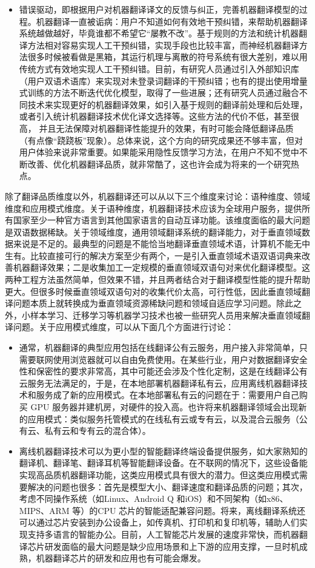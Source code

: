 \begin{spacing}{1.18}
\begin{itemize}
\item 错误驱动，即根据用户对机器翻译译文的反馈与纠正，完善机器翻译模型的过程。机器翻译一直被诟病：用户不知道如何有效地干预纠错，来帮助机器翻译系统越做越好，毕竟谁都不希望它“屡教不改”。基于规则的方法和统计机器翻译方法相对容易实现人工干预纠错，实现手段也比较丰富，而神经机器翻译方法很多时候被看做是黑箱，其运行机理与离散的符号系统有很大差别，难以用传统方式有效地实现人工干预纠错。目前，有研究人员通过引入外部知识库（用户双语术语库）来实现对未登录词翻译的干预纠错；也有的提出使用增量式训练的方法不断迭代优化模型，取得了一些进展；还有研究人员通过融合不同技术来实现更好的机器翻译效果，如引入基于规则的翻译前处理和后处理，或者引入统计机器翻译技术优化译文选择等。这些方法的代价不低，甚至很高， 并且无法保障对机器翻译性能提升的效果，有时可能会降低翻译品质（有点像“跷跷板”现象）。总体来说，这个方向的研究成果还不够丰富，但对用户体验来说非常重要。如果能采用隐性反馈学习方法，在用户不知不觉中不断改善、优化机器翻译品质，就非常酷了，这也许会成为将来的一个研究热点。
\end{itemize}

\parinterval 除了翻译品质维度以外，机器翻译还可以从以下三个维度来讨论：语种维度、领域维度和应用模式维度。关于语种维度，机器翻译技术应该为全球用户服务，提供所有国家至少一种官方语言到其他国家语言的自动互译功能。该维度面临的最大问题是双语数据稀缺。关于领域维度，通用领域翻译系统的翻译能力，对于垂直领域数据来说是不足的。最典型的问题是不能恰当地翻译垂直领域术语，计算机不能无中生有。比较直接可行的解决方案至少有两个，一是引入垂直领域术语双语词典来改善机器翻译效果；二是收集加工一定规模的垂直领域双语句对来优化翻译模型。这两种工程方法虽然简单，但效果不错，并且两者结合对于翻译模型性能的提升帮助更大。但很多时候垂直领域双语句对的收集代价太高，可行性低，因此垂直领域翻译问题本质上就转换成为垂直领域资源稀缺问题和领域自适应学习问题。除此之外，小样本学习、迁移学习等机器学习技术也被一些研究人员用来解决垂直领域翻译问题。关于应用模式维度，可以从下面几个方面进行讨论：
\begin{itemize}
\item 通常，机器翻译的典型应用包括在线翻译公有云服务，用户接入非常简单，只需要联网使用浏览器就可以自由免费使用。在某些行业，用户对数据翻译安全性和保密性的要求非常高，其中可能还会涉及个性化定制，这是在线翻译公有云服务无法满足的，于是，在本地部署机器翻译私有云，应用离线机器翻译技术和服务成了新的应用模式。在本地部署私有云的问题在于：需要用户自己购买 GPU 服务器并建机房，对硬件的投入高。也许将来机器翻译领域会出现新的应用模式：类似服务托管模式的在线私有云或专有云，以及混合云服务（公有云、私有云和专有云的混合体）。

\item 离线机器翻译技术可以为更小型的智能翻译终端设备提供服务，如大家熟知的翻译机、翻译笔、翻译耳机等智能翻译设备。在不联网的情况下，这些设备能实现高品质机器翻译功能，这类应用模式具有很大的潜力。但这类应用模式需要解决的问题也很多：首先是模型大小、翻译速度和翻译品质的问题；其次，考虑不同操作系统（如Linux、Android Q 和iOS）和不同架构（如x86、MIPS、ARM 等）的CPU 芯片的智能适配兼容问题。将来，离线翻译系统还可以通过芯片安装到办公设备上，如传真机、打印机和复印机等，辅助人们实现支持多语言的智能办公。目前，人工智能芯片发展的速度非常快，而机器翻译芯片研发面临的最大问题是缺少应用场景和上下游的应用支撑，一旦时机成熟，机器翻译芯片的研发和应用也有可能会爆发。


\end{itemize}
\end{spacing}
